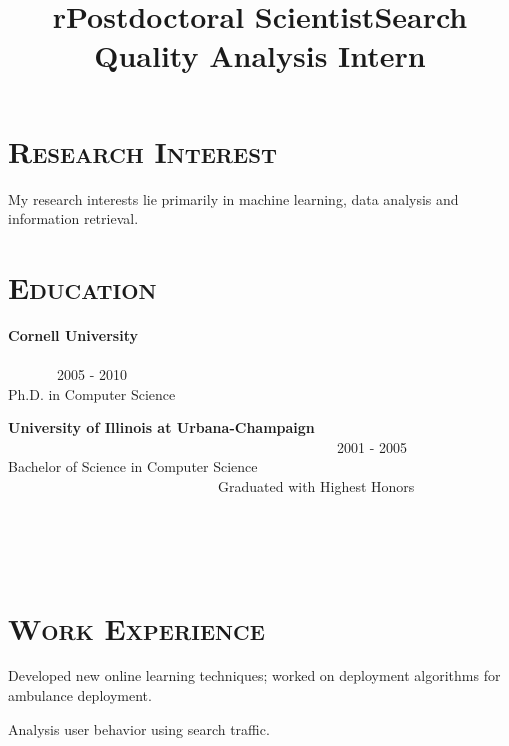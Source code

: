 \begin{resume}




\section{\textsc{Research Interest}}
My research interests lie primarily in machine learning, data analysis and information retrieval. 

\section{\textsc{Education}}

\textbf{Cornell University} \ \ \ \ \ \ \ \ \ \ \ \ \ \ \ \ \ \ \ \ \ \ \ \ \ \ \ \ \ \ \ \ \ \ \ \ \ \ \ \ \ \ \ \ \ \ \ \ \ \ \ \ \ \ \ \ \ \ \ \ \ \ \ \ \ \ \ \ \ \ \ \ \ \ \ \ \ \ \ 2005 - 2010 \\
Ph.D. in Computer Science

\textbf{University of Illinois at Urbana-Champaign} \ \ \ \ \ \ \ \ \ \ \ \ \ \ \ \ \ \ \ \ \ \ \ \ \ \ \ \ \ \ \ \ \ \ \ \ \ \ \ \ \ \ \ \ \ \ \ 2001 - 2005 \\ 
Bachelor of Science in Computer Science \ \ \ \ \ \ \ \ \ \ \ \ \ \ \ \ \ \ \ \ \ \ \ \ \ \ \ \ \ \ Graduated with Highest Honors




\begin{formatb}
  \title{r}\\
  \\
  \body\\
\end{formatb}

\section{\textsc{Work Experience}}

\title{Postdoctoral Scientist}
\begin{position}
Developed new online learning techniques; worked on deployment algorithms for ambulance deployment.
\end{position}


\title{Search Quality Analysis Intern}
\begin{position}
Analysis user behavior using search traffic.
\end{position}


\end{resume}

